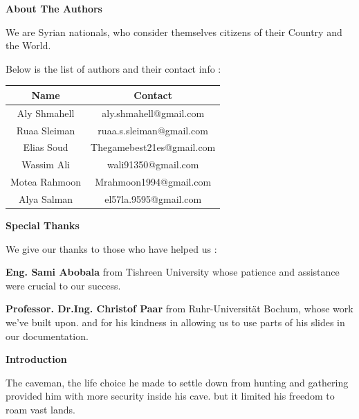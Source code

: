 \documentclass{slides}
\begin{document}
\newpage
\begin{center} \textbf{\Large About The Authors} \end{center}
\begin{center}
We are Syrian nationals, who consider themselves citizens of their Country and the World.
\end{center}
\begin{center}
\begin{small}
Below is the list of authors and their contact  info :
\end{small}
\end{center}
\begin{center}
\begin{scriptsize}
 \begin{tabular}{|c | c|} 
 \hline
 Name & Contact \\ [0.5ex] 
 \hline\hline
 Aly Shmahell & aly.shmahell@gmail.com \\ 
 \hline
 Ruaa Sleiman  & ruaa.s.sleiman@gmail.com \\
 \hline
 Elias Soud & Thegamebest21es@gmail.com \\
 \hline
 Wassim Ali & wali91350@gmail.com \\
 \hline
 Motea Rahmoon &  Mrahmoon1994@gmail.com \\ [1ex] 
 \hline
 Alya Salman & el57la.9595@gmail.com\\
 \hline
\end{tabular}
\end{scriptsize}
\end{center}
\newpage
\begin{center}
\textbf{\Large Special Thanks}
\end{center}
\begin{center}
We give our thanks to those who have helped us :
\end{center}
\begin{center}
\textbf{Eng. Sami Abobala} from Tishreen University whose patience and assistance were crucial to our success.
\end{center}
\begin{center}
\textbf{Professor. Dr.Ing. Christof Paar} from Ruhr-Universität Bochum, whose work we've built upon. and for his kindness in allowing us to use parts of his slides in our documentation.
\end{center}
\newpage
\begin{center}
\textbf{\Large Introduction}
\end{center}
\begin{center}
The caveman, the life choice he made to settle down from hunting and gathering provided him with more security inside his cave. but it limited his freedom to roam vast lands.
\end{center}
\end{document}
